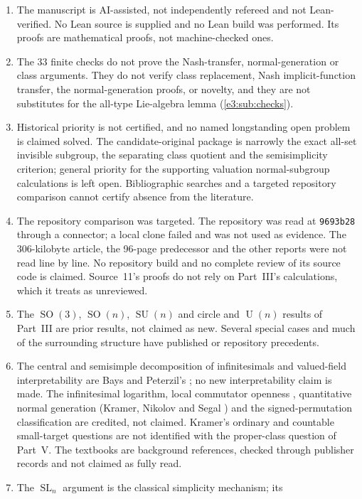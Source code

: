 \documentclass[11pt,letterpaper]{article}
\numberwithin{equation}{section}
\theoremstyle{definition}
\theoremstyle{remark}
\newcommand{\SO}{\operatorname{SO}}
\newcommand{\SU}{\operatorname{SU}}
\newcommand{\Un}{\operatorname{U}}
\newcommand{\SL}{\operatorname{SL}}
\begin{document}
\begin{enumerate}[label=\textup{P\arabic*.},leftmargin=2.6em]
\item The manuscript is AI-assisted, not independently refereed and not
 Lean-verified. No Lean source is supplied and no Lean build was performed. Its
 proofs are mathematical proofs, not machine-checked ones.
\item The 33 finite checks do not prove the Nash-transfer, normal-generation or
 class arguments. They do not verify class replacement, Nash implicit-function
 transfer, the normal-generation proofs, or novelty, and they are not
 substitutes for the all-type Lie-algebra lemma (\cref{e3:sub:checks}).
\item Historical priority is not certified, and no named longstanding open
 problem is claimed solved. The candidate-original package is narrowly the
 exact all-set invisible subgroup, the separating class quotient and the
 semisimplicity criterion; general priority for the supporting valuation
 normal-subgroup calculations is left open. Bibliographic searches and a
 targeted repository comparison cannot certify absence from the literature.
\item The repository comparison was targeted. The repository was read at
 \texttt{9693b28} through a connector; a local clone failed and was not used as
 evidence. The 306-kilobyte article, the 96-page predecessor and the other reports
 were not read line by line. No repository build and no complete review of its
 source code is claimed. Source~11's proofs do not rely on Part~III's
 calculations, which it treats as unreviewed.
\item The $\SO(3)$, $\SO(n)$, $\SU(n)$ and circle and $\Un(n)$ results of
 Part~III are prior results, not claimed as new. Several special cases and much
 of the surrounding structure have published or repository precedents.
\item The central and semisimple decomposition of infinitesimals and
 valued-field interpretability are Bays and Peterzil's \cite{BP}; no new
 interpretability claim is made. The infinitesimal logarithm, local commutator
 openness \cite{DM}, quantitative normal generation (Kramer, Nikolov and Segal
 \cite{Kramer}) and the signed-permutation classification are credited, not
 claimed. Kramer's ordinary and countable small-target questions are not
 identified with the proper-class question of Part~V. The textbooks
 \cite{Conway,Gonshor,BCR} are background references, checked through
 publisher records and not claimed as fully read.
\item The $\SL_n$ argument is the classical simplicity mechanism; its

\end{enumerate}
\end{document}
